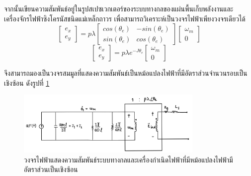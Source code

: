 \documentclass[11pt,a4paper]{article}
\begin{document}
จากนั้นเขียนความสัมพันธ์อยู่ในรูปสเปซเวกเตอร์ของระบบทางกลของแผ่นพื้นเก็บพลังงานและ เครื่องจักรไฟฟ้าซิงโครนัสชนิดแม่เหล็กถาวร เพื่อสามารถวิเคราะห์เป็นวงจรไฟฟ้าเพียงวงจรเดียวได้
\begin{equation}
    \begin{bmatrix}
        e_{x} \\ e_{y}
    \end{bmatrix} = p\lambda
    \begin{bmatrix}
        cos(\theta_{e}) & -sin(\theta_{e}) \\ sin(\theta_{e}) & cos(\theta_{e})
    \end{bmatrix}
    \begin{bmatrix}
        \omega_{m} \\ 0
    \end{bmatrix}
\end{equation}
\begin{equation}
    \begin{bmatrix}
        e_{x} \\ e_{y}
    \end{bmatrix} = p\lambda e^{-J \theta_{e} }
    \begin{bmatrix}
        \omega_{m} \\ 0
    \end{bmatrix}
\end{equation}

จึงสามารถมองเป็นวงจรสมมูลที่แสดงความสัมพันธ์เป็นหม้อแปลงไฟฟ้าที่มีอัตราส่วนจำนวนรอบเป็นเชิงซ้อน ดังรูปที่ \ref{cir_mech_elec_2n}
\begin{figure}[H]
    \begin{center}
        \includegraphics[width=0.8\textwidth]{cir_mech_elec_2n.jpg}
    \end{center}
    \caption{วงจรไฟฟ้าแสดงความสัมพันธ์ระบบทางกลและเครื่องกำเนิดไฟฟ้าที่มีหม้อแปลงไฟฟ้ามีอัตราส่วนเป็นเชิงซ้อน}
    \label{cir_mech_elec_2n}
\end{figure}
\end{document}
